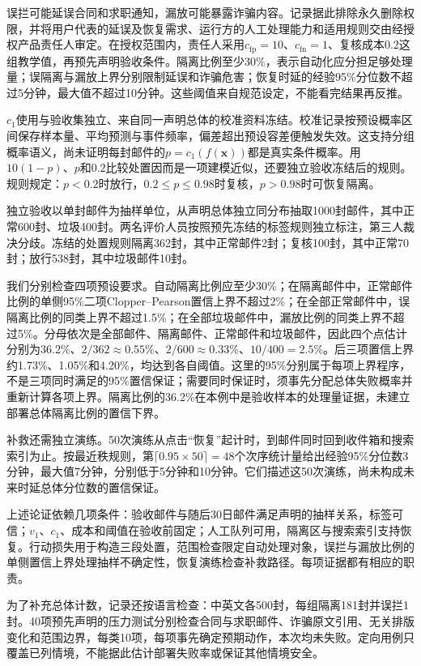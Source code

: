 误拦可能延误合同和求职通知，漏放可能暴露诈骗内容。记录据此排除永久删除权限，并将用户代表的延误及恢复需求、运行方的人工处理能力和适用规则交由经授权产品责任人审定。在授权范围内，责任人采用$c_{\mathrm{fp}}=10$、$c_{\mathrm{fn}}=1$、复核成本$0.2$这组教学值，再预先声明验收条件。隔离比例至少30\%，表示自动化应分担足够处理量；误隔离与漏放上界分别限制延误和诈骗危害；恢复时延的经验95\%分位数不超过5分钟，最大值不超过10分钟。这些阈值来自规范设定，不能看完结果再反推。

$c_1$使用与验收集独立、来自同一声明总体的校准资料冻结。校准记录按预设概率区间保存样本量、平均预测与事件频率，偏差超出预设容差便触发失效。这支持分组概率语义，尚未证明每封邮件的$p=c_1(f(\bm x))$都是真实条件概率。用$10(1-p)$、$p$和$0.2$比较处置因而是一项建模近似，还要独立验收冻结后的规则。规则规定：$p<0.2$时放行，$0.2\leq p\leq0.98$时复核，$p>0.98$时可恢复隔离。

独立验收以单封邮件为抽样单位，从声明总体独立同分布抽取1000封邮件，其中正常600封、垃圾400封。两名评价人员按照预先冻结的标签规则独立标注，第三人裁决分歧。冻结的处置规则隔离362封，其中正常邮件2封；复核100封，其中正常70封；放行538封，其中垃圾邮件10封。

我们分别检查四项预设要求。自动隔离比例应至少30\%；在隔离邮件中，正常邮件比例的单侧95\%二项Clopper--Pearson置信上界不超过2\%；在全部正常邮件中，误隔离比例的同类上界不超过1.5\%；在全部垃圾邮件中，漏放比例的同类上界不超过5\%。分母依次是全部邮件、隔离邮件、正常邮件和垃圾邮件，因此四个点估计分别为36.2\%、$2/362\approx0.55\%$、$2/600\approx0.33\%$、$10/400=2.5\%$。后三项置信上界约1.73\%、1.05\%和4.20\%，均达到各自阈值。这里的95\%分别属于每项上界程序，不是三项同时满足的95\%置信保证；需要同时保证时，须事先分配总体失败概率并重新计算各项上界。隔离比例的36.2\%在本例中是验收样本的处理量证据，未建立部署总体隔离比例的置信下界。

补救还需独立演练。50次演练从点击“恢复”起计时，到邮件同时回到收件箱和搜索索引为止。按最近秩规则，第$\lceil0.95\times50\rceil=48$个次序统计量给出经验95\%分位数3分钟，最大值7分钟，分别低于5分钟和10分钟。它们描述这50次演练，尚未构成未来时延总体分位数的置信保证。

上述论证依赖几项条件：验收邮件与随后30日邮件满足声明的抽样关系，标签可信；$v_1$、$c_1$、成本和阈值在验收前固定；人工队列可用，隔离区与搜索索引支持恢复。行动损失用于构造三段处置，范围检查限定自动处理对象，误拦与漏放比例的单侧置信上界处理抽样不确定性，恢复演练检查补救路径。每项证据都有相应的职责。

为了补充总体计数，记录还按语言检查：中英文各500封，每组隔离181封并误拦1封。40项预先声明的压力测试分别检查合同与求职邮件、诈骗原文引用、无关排版变化和范围边界，每类10项，每项事先确定预期动作，本次均未失败。定向用例只覆盖已列情境，不能据此估计部署失败率或保证其他情境安全。

